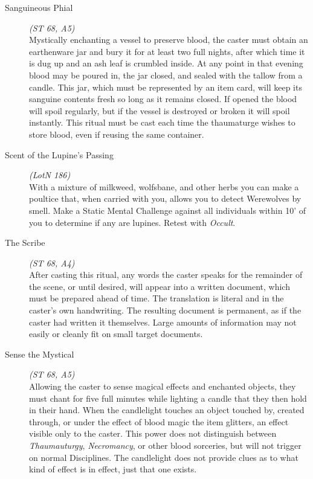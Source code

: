\begin{description}
	\item[Sanguineous Phial] \emph{(ST 68, A5)} \hfill \\
	Mystically enchanting a vessel to preserve blood, the caster must obtain an earthenware jar and bury it for at least two full 
	nights, after which time it is dug up and an ash leaf is crumbled inside. At any point in that evening blood may be poured in, 
	the jar closed, and sealed with the tallow from a candle.  This jar, which must be represented by an item card, will keep its 
	sanguine contents fresh so long as it remains closed.  If opened the blood will spoil regularly, but if the vessel is destroyed 
	or broken it will spoil instantly.  This ritual must be cast each time the thaumaturge wishes to store blood, even if reusing 
	the same container. \\

	\item[Scent of the Lupine's Passing] \emph{(LotN 186)} \hfill \\
	With a mixture of milkweed, wolfsbane, and other herbs you can make a poultice that, when carried with you, allows you to 
	detect Werewolves by smell.  Make a Static Mental Challenge against all individuals within 10' of you to determine if any are 
	lupines.  Retest with \emph{Occult}. \\
	
	\item[The Scribe] \emph{(ST 68, A4)} \hfill \\
	After casting this ritual, any words the caster speaks for the remainder of the scene, or until desired, will appear into a 
	written document, which must be prepared ahead of time.  The translation is literal and in the caster's own handwriting.  
	The resulting document is permanent, as if the caster had written it themselves.  Large amounts of information may not easily 
	or cleanly fit on small target documents. \\

	\item[Sense the Mystical] \emph{(ST 68, A5)} \hfill \\
	Allowing the caster to sense magical effects and enchanted objects, they must chant for five full minutes while lighting a 
	candle that they then hold in their hand.  When the candlelight touches an object touched by, created through, or under the 
	effect of blood magic the item glitters, an effect visible only to the caster.  This power does not distinguish between 
	\emph{Thaumauturgy}, \emph{Necromancy}, or other blood sorceries, but will not trigger on normal Disciplines.  The candlelight 
	does not provide clues as to what kind of effect is in effect, just that one exists. \\


\end{description}
